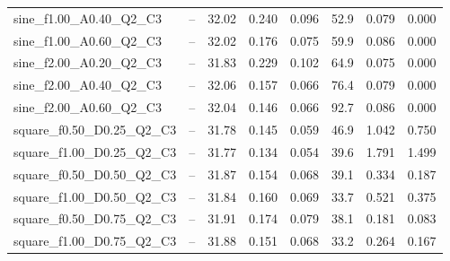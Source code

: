 \begin{table}[h]
\begin{tabular}{lrrrrrrr}
sine\_f1.00\_A0.40\_Q2\_C3 & -- & 32.02 & 0.240 & 0.096 & 52.9 & 0.079 & 0.000 \\
sine\_f1.00\_A0.60\_Q2\_C3 & -- & 32.02 & 0.176 & 0.075 & 59.9 & 0.086 & 0.000 \\
sine\_f2.00\_A0.20\_Q2\_C3 & -- & 31.83 & 0.229 & 0.102 & 64.9 & 0.075 & 0.000 \\
sine\_f2.00\_A0.40\_Q2\_C3 & -- & 32.06 & 0.157 & 0.066 & 76.4 & 0.079 & 0.000 \\
sine\_f2.00\_A0.60\_Q2\_C3 & -- & 32.04 & 0.146 & 0.066 & 92.7 & 0.086 & 0.000 \\
square\_f0.50\_D0.25\_Q2\_C3 & -- & 31.78 & 0.145 & 0.059 & 46.9 & 1.042 & 0.750 \\
square\_f1.00\_D0.25\_Q2\_C3 & -- & 31.77 & 0.134 & 0.054 & 39.6 & 1.791 & 1.499 \\
square\_f0.50\_D0.50\_Q2\_C3 & -- & 31.87 & 0.154 & 0.068 & 39.1 & 0.334 & 0.187 \\
square\_f1.00\_D0.50\_Q2\_C3 & -- & 31.84 & 0.160 & 0.069 & 33.7 & 0.521 & 0.375 \\
square\_f0.50\_D0.75\_Q2\_C3 & -- & 31.91 & 0.174 & 0.079 & 38.1 & 0.181 & 0.083 \\
square\_f1.00\_D0.75\_Q2\_C3 & -- & 31.88 & 0.151 & 0.068 & 33.2 & 0.264 & 0.167 \\
\bottomrule\end{tabular}\end{table}
